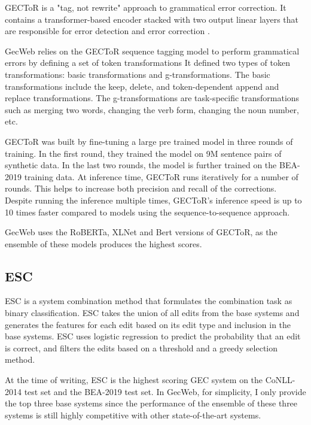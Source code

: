 GECToR is a "tag, not rewrite" approach to grammatical error correction.
It contains a transformer-based encoder stacked with two output linear layers that are responsible for error detection and error correction \citep{omelianchuk-etal-2020-gector}.

GecWeb relies on the GECToR sequence tagging model to perform grammatical errors by defining a set of token transformations
It defined two types of token transformations: basic transformations and g-transformations.
The basic transformations include the keep, delete, and token-dependent append and replace transformations.
The g-transformations are task-specific transformations such as merging two words, changing the verb form, changing the noun number, etc.

GECToR was built by fine-tuning a large pre trained model in three rounds of training.
In the first round, they trained the model on 9M sentence pairs of synthetic data.
In the last two rounds, the model is further trained on the BEA-2019 training data.
At inference time, GECToR runs iteratively for a number of rounds.
This helps to increase both precision and recall of the corrections.
Despite running the inference multiple times, GECToR's inference speed is up to 10 times faster compared to models using the sequence-to-sequence approach.

GecWeb uses the RoBERTa, XLNet and Bert versions of GECToR, as the ensemble of these models produces the highest scores.

\subsection{ESC}
\label{esc}

ESC is a system combination method that formulates the combination task as binary classification.
ESC takes the union of all edits from the base systems and generates the features for each edit based on its edit type and inclusion in the base systems.
ESC uses logistic regression to predict the probability that an edit is correct, and filters the edits based
on a threshold and a greedy selection method.

At the time of writing, ESC is the highest scoring GEC system on the CoNLL-2014 test set and the BEA-2019 test set.
In GecWeb, for simplicity, I only provide the top three base systems since the performance of the
ensemble of these three systems is still highly competitive with other state-of-the-art systems.

